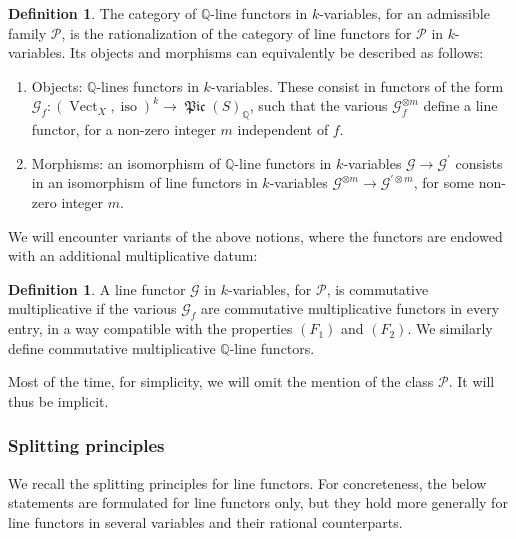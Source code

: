 \documentclass[JEP,XML,SOM,Unicode,published]{cedram}
\theoremstyle{plain}
\theoremstyle{definition}
\newtheorem{definition}[theorem]{Definition}
\newcommand{\QBbb}{\mathbb Q}
\newcommand{\Gcal}{\mathcal G}
\newcommand{\Pcal}{\mathcal P}
\DeclareMathOperator{\Picfr}{\mathfrak{Pic}}
\DeclareMathOperator{\iso}{iso}
\DeclareMathOperator{\Vect}{Vect}
\begin{document}
\begin{definition}
The category of $\QBbb$-line functors in $k$-variables, for an admissible family $\Pcal$, is the rationalization of the category of line functors for $\Pcal$ in $k$-variables. Its objects and morphisms can equivalently be described as follows:
\begin{enumerate}
\item Objects: $\QBbb$-lines functors in $k$-variables. These consist in functors of the form $\Gcal_{f} \colon (\Vect_{X}, \iso)^{k} \to \Picfr(S)_{\QBbb}$, such that the various $\Gcal_{f}^{\otimes m}$ define a line functor, for a non-zero integer $m$ independent of $f$.
\item Morphisms: an isomorphism of $\QBbb$-line functors in $k$-variables $\Gcal\to\Gcal^{\prime}$ consists in an isomorphism of line functors in $k$-variables $\Gcal^{\otimes m}\to\Gcal^{\prime\otimes m}$, for some non-zero integer $m$.
\end{enumerate}
\end{definition}

We will encounter variants of the above notions, where the functors are endowed with an additional multiplicative datum:

\begin{definition}
A line functor $\Gcal$ in $k$-variables, for $\Pcal$, is commutative multiplicative if the various $\Gcal_{f}$ are commutative multiplicative functors in every entry, in a way compatible with the properties $(F_{1})$ and $(F_{2})$. We similarly define commutative multiplicative $\QBbb$-line functors.
\end{definition}
Most of the time, for simplicity, we will omit the mention of the class $\Pcal$. It will thus be implicit.

\subsubsection{Splitting principles}\label{subsubsec:splitting-principle}
We recall the splitting principles for line functors. For concreteness, the below statements are formulated for line functors only, but they hold more generally for line functors in several variables and their rational counterparts.
\end{document}
